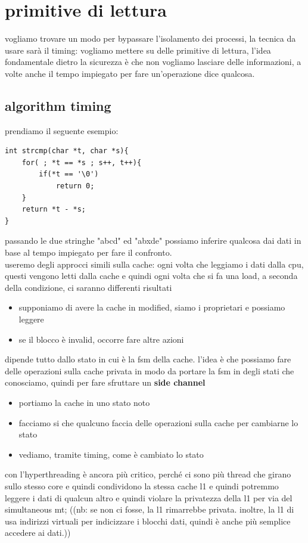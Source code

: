 \documentclass[12pt, oneside]{extbook} %
\begin{document}
\section{primitive di lettura}
vogliamo trovare un modo per bypassare l'isolamento dei processi, la tecnica da usare sarà il timing: vogliamo mettere su delle primitive di lettura, l'idea fondamentale dietro la sicurezza è che non vogliamo lasciare delle informazioni, a volte anche il tempo impiegato per fare un'operazione dice qualcosa. 
\subsection{algorithm timing}
prendiamo il seguente esempio:
\begin{lstlisting}
int strcmp(char *t, char *s){
	for( ; *t == *s ; s++, t++){
		if(*t == '\0')
			return 0;	
	}
	return *t - *s;
}
\end{lstlisting}
passando le due stringhe "abcd" ed "abxde" possiamo inferire qualcosa dai dati in base al tempo impiegato per fare il confronto.\\ useremo degli approcci simili sulla cache: ogni volta che leggiamo i dati dalla cpu, questi vengono letti dalla cache e quindi ogni volta che si fa una load, a seconda della condizione, ci saranno differenti risultati
\begin{itemize}
\item supponiamo di avere la cache in modified, siamo i proprietari e possiamo leggere
\item se il blocco è invalid, occorre fare altre azioni
\end{itemize}
dipende tutto dallo stato in cui è la fsm della cache. l'idea è che possiamo fare delle operazioni sulla cache privata in modo da portare la fsm in degli stati che conosciamo, quindi per fare sfruttare un \textbf{side channel}
\begin{itemize}
\item portiamo la cache in uno stato noto
\item facciamo si che qualcuno faccia delle operazioni sulla cache per cambiarne lo stato
\item vediamo, tramite timing, come è cambiato lo stato
\end{itemize}
con l'hyperthreading è ancora più critico, perché ci sono più thread che girano sullo stesso core e quindi condividono la stessa cache l1 e quindi potremmo leggere i dati di qualcun altro e quindi violare la privatezza della l1 per via del simultaneous mt; ((nb: se non ci fosse, la l1 rimarrebbe privata. inoltre, la l1 di usa indirizzi virtuali per indicizzare i blocchi dati, quindi è anche più semplice accedere ai dati.))
\end{document}

